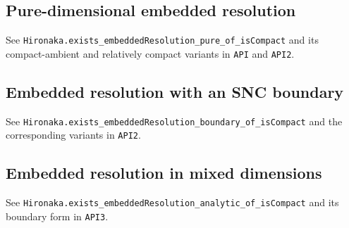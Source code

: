 \documentclass[11pt,a4paper]{article}
\theoremstyle{definition}
\begin{document}
\subsection{Pure-dimensional embedded resolution}\label{hir:embedded-resolution-pure-dimensional}
See \texttt{Hironaka.exists\_embeddedResolution\_pure\_of\_isCompact} and its compact-ambient and relatively compact variants in \texttt{API} and \texttt{API2}.
\subsection{Embedded resolution with an SNC boundary}\label{hir:embedded-resolution-boundary}
See \texttt{Hironaka.exists\_embeddedResolution\_boundary\_of\_isCompact} and the corresponding variants in \texttt{API2}.
\subsection{Embedded resolution in mixed dimensions}\label{hir:embedded-resolution-analytic}
See \texttt{Hironaka.exists\_embeddedResolution\_analytic\_of\_isCompact} and its boundary form in \texttt{API3}.






























\end{document}
